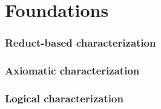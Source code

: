 \part{Foundations}


\section{Reduct-based characterization}


\section{Axiomatic characterization}
% 


\section{Logical characterization}

%
